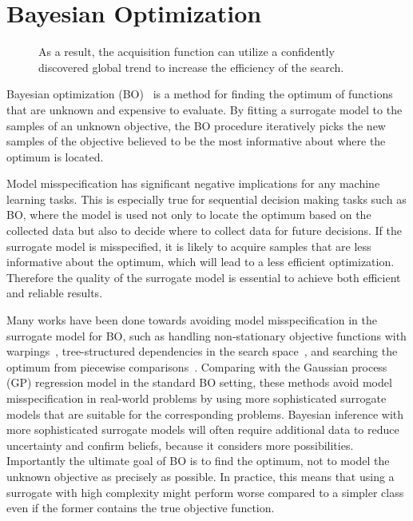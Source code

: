 \section{Bayesian Optimization}
\begin{figure}[t]
    \centering
    \caption{
        \label{fig:bo:posterior}
        As a result, the acquisition function can utilize a confidently discovered global trend to increase the efficiency of the search.
    }
\end{figure}
Bayesian optimization (BO)~\cite{snoek2012practical} is a method for finding the optimum of functions that are unknown and expensive to evaluate.
By fitting a surrogate model to the samples of an unknown objective, the BO procedure iteratively picks the new samples of the objective believed to be the most informative about where the optimum is located.

Model misspecification has significant negative implications for any machine learning tasks.
This is especially true for sequential decision making tasks such as BO, where the model is used not only to locate the optimum based on the collected data but also to decide where to collect data for future decisions.
If the surrogate model is misspecified, it is likely to acquire samples that are less informative about the optimum, which will lead to a less efficient optimization.
Therefore the quality of the surrogate model is essential to achieve both efficient and reliable results.

Many works have been done towards avoiding model misspecification in the surrogate model for BO, such as handling non-stationary objective functions with warpings~\cite{snoek2014input}, tree-structured dependencies in the search space~\cite{jenatton2017bayesian}, and searching the optimum from piecewise comparisons~\cite{gonzalez2017preferential}.
Comparing with the Gaussian process (GP) regression model in the standard BO setting, these methods avoid model misspecification in real-world problems by using more sophisticated surrogate models that are suitable for the corresponding problems.
Bayesian inference with more sophisticated surrogate models will often require additional data to reduce uncertainty and confirm beliefs, because it considers more possibilities.
Importantly the ultimate goal of BO is to find the optimum, not to model the unknown objective as precisely as possible.
In practice, this means that using a surrogate with high complexity might perform worse compared to a simpler class
even if the former contains the true objective function.

